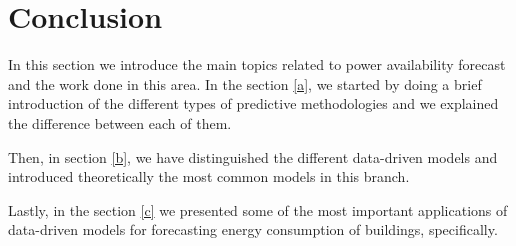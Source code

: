 \section{Conclusion}

In this section we introduce the main topics related to power availability forecast and the work done in this area. In the section \ref{a}, we started by doing a brief introduction of the different types of predictive methodologies and we explained the difference between each of them.

Then, in section \ref{b}, we have distinguished the different data-driven models and introduced theoretically the most common models in this branch.

Lastly, in the section \ref{c} we presented some of the most important applications of data-driven models for forecasting energy consumption of buildings, specifically.
